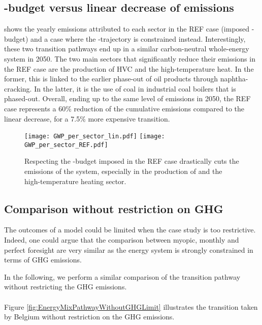 \subsection{-budget versus linear decrease of emissions}
\label{app:CO2_budget}

 shows the yearly emissions attributed to each sector in the REF case (\ie imposed -budget) and a case where the -trajectory is constrained instead. Interestingly, these two transition pathways end up in a similar carbon-neutral whole-energy system in 2050. The two main sectors that significantly reduce their emissions in the REF case are the production of \gls{HVC} and the high-temperature heat. In the former, this is linked to the earlier phase-out of oil products through naphtha-cracking. In the latter, it is the use of coal in industrial coal boilers that is phased-out. Overall, ending up to the same level of emissions in 2050, the REF case represents a 60\% reduction of the cumulative emissions compared to the linear decrease, for a 7.5\% more expensive transition.

\begin{figure}[htbp!]
\centering
\texttt{[image: GWP\_per\_sector\_lin.pdf]}
\texttt{[image: GWP\_per\_sector\_REF.pdf]}
\caption{Respecting the -budget imposed in the REF case drastically cuts the emissions of the system, especially in the production of  and the high-temperature heating sector.}
\label{fig:app_CO2_REF_lin}
\end{figure}

\subsection{Comparison without restriction on \gls{GHG}}
\label{app:pfmomy_comparison_without_GHG}

The outcomes of a model could be limited when the case study is too restrictive. Indeed, one could argue that the comparison between myopic, monthly and perfect foresight are very similar as the energy system is strongly constrained in terms of \gls{GHG} emissions.

In the following, we perform a similar comparison of the transition pathway without restricting the \gls{GHG} emissions. \\

\\

\noindent
Figure \ref{fig:EnergyMixPathwayWithoutGHGLimit} illustrates the transition taken by Belgium without restriction on the \gls{GHG} emissions. 


